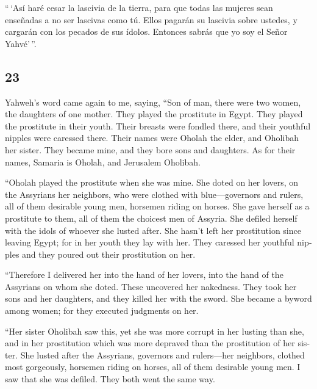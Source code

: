 \begin{paracol}{2}
 ``\,`Así haré cesar la lascivia de la tierra, para que
todas las mujeres sean enseñadas a no ser lascivas como tú.
 Ellos pagarán su lascivia sobre ustedes, y cargarán con
los pecados de sus ídolos. Entonces sabrás que yo soy el Señor
Yahvé'\,''.

\switchcolumn
\begin{otherlanguage}{english}

\hypertarget{section-45}{%
\section{23}\label{section-45}}

 Yahweh's word came again to me, saying, 
``Son of man, there were two women, the daughters of one mother.
 They played the prostitute in Egypt. They played the
prostitute in their youth. Their breasts were fondled there, and their
youthful nipples were caressed there.  Their names were
Oholah the elder, and Oholibah her sister. They became mine, and they
bore sons and daughters. As for their names, Samaria is Oholah, and
Jerusalem Oholibah.

 ``Oholah played the prostitute when she was mine. She
doted on her lovers, on the Assyrians her neighbors,  who
were clothed with blue---governors and rulers, all of them desirable
young men, horsemen riding on horses.  She gave herself as
a prostitute to them, all of them the choicest men of Assyria. She
defiled herself with the idols of whoever she lusted after.
 She hasn't left her prostitution since leaving Egypt; for
in her youth they lay with her. They caressed her youthful nipples and
they poured out their prostitution on her.

 ``Therefore I delivered her into the hand of her lovers,
into the hand of the Assyrians on whom she doted.  These
uncovered her nakedness. They took her sons and her daughters, and they
killed her with the sword. She became a byword among women; for they
executed judgments on her.

 ``Her sister Oholibah saw this, yet she was more corrupt
in her lusting than she, and in her prostitution which was more depraved
than the prostitution of her sister.  She lusted after
the Assyrians, governors and rulers---her neighbors, clothed most
gorgeously, horsemen riding on horses, all of them desirable young men.
 I saw that she was defiled. They both went the same way.


\end{otherlanguage}
\end{paracol}
